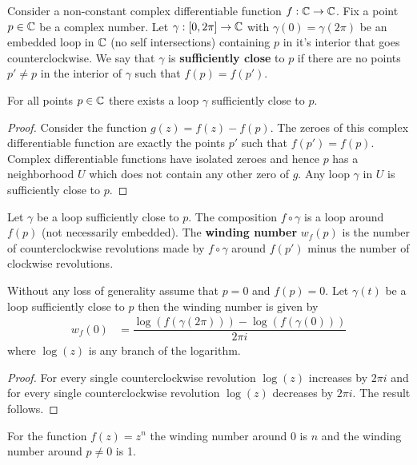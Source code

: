 Consider a non-constant complex differentiable function $f:\mathbb{C} \rightarrow \mathbb{C}$. Fix a point $p \in \mathbb{C}$ be a complex number. Let $\gamma:[0,2\pi] \rightarrow \mathbb{C}$ with $\gamma(0) = \gamma(2\pi)$ be an embedded loop in $\mathbb{C}$ (no self intersections) containing $p$ in it's interior that goes counterclockwise. We say that $\gamma$ is \textbf{sufficiently close} to $p$ if there are no points $p' \neq p$ in the interior of $\gamma$ such that $f(p) = f(p')$.

\begin{proposition}
	For all points $p \in \mathbb{C}$ there exists a loop $\gamma$ sufficiently close to $p$.
\end{proposition}
\begin{proof}
	Consider the function $g(z) = f(z) - f(p)$. The zeroes of this complex differentiable function are exactly the points $p'$ such that $f(p') = f(p)$. Complex differentiable functions have isolated zeroes and hence $p$ has a neighborhood $U$ which does not contain any other zero of $g$. Any loop $\gamma$ in $U$ is sufficiently close to $p$.
\end{proof}


\begin{definition}
	Let $\gamma$ be a loop sufficiently close to $p$. The composition $f \circ \gamma$ is a loop around $f(p)$ (not necessarily embedded). The \textbf{winding number} $w_f(p)$ is the number of counterclockwise revolutions made by $f \circ \gamma$ around $f(p')$ minus the number of clockwise revolutions.
\end{definition}

\begin{proposition}
	Without any loss of generality assume that $p=0$ and $f(p) = 0$. Let $\gamma(t)$  be a loop sufficiently close to $p$ then the winding number is given by
	\begin{align}
		\label{eq:winding}
		w_f(0) & = \dfrac{\log(f ( \gamma(2 \pi))) - \log(f ( \gamma(0)))}{2 \pi i}
	\end{align}
	where $\log(z)$ is any branch of the logarithm.
\end{proposition}
\begin{proof}
	For every single counterclockwise revolution $\log(z)$ increases by $2 \pi i$ and for every single counterclockwise revolution $\log(z)$ decreases by $ 2 \pi i$. The result follows.
\end{proof}

\begin{example}
	For the function $f(z) = z^n$ the winding number around 0 is $n$ and the winding number around $p \neq 0$ is 1.
\end{example}



